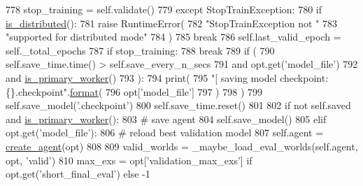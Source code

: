 \begin{DoxyCode}
778                         stop\_training = self.validate()
779                     \textcolor{keywordflow}{except} StopTrainException:
780                         \textcolor{keywordflow}{if} \hyperlink{namespaceparlai_1_1utils_1_1distributed_a023acb5e3b66e1f27e21247c35661279}{is\_distributed}():
781                             \textcolor{keywordflow}{raise} RuntimeError(
782                                 \textcolor{stringliteral}{"StopTrainException not "}
783                                 \textcolor{stringliteral}{"supported for distributed mode"}
784                             )
785                         \textcolor{keywordflow}{break}
786                     self.last\_valid\_epoch = self.\_total\_epochs
787                     \textcolor{keywordflow}{if} stop\_training:
788                         \textcolor{keywordflow}{break}
789                 \textcolor{keywordflow}{if} (
790                     self.save\_time.time() > self.save\_every\_n\_secs
791                     \textcolor{keywordflow}{and} opt.get(\textcolor{stringliteral}{'model\_file'})
792                     \textcolor{keywordflow}{and} \hyperlink{namespaceparlai_1_1utils_1_1distributed_a9bb1dac198180590ef8c6b6c6f9fc2c4}{is\_primary\_worker}()
793                 ):
794                     print(
795                         \textcolor{stringliteral}{"[ saving model checkpoint: \{\}.checkpoint"}.\hyperlink{namespaceparlai_1_1chat__service_1_1services_1_1messenger_1_1shared__utils_a32e2e2022b824fbaf80c747160b52a76}{format}(
796                             opt[\textcolor{stringliteral}{'model\_file'}]
797                         )
798                     )
799                     self.save\_model(\textcolor{stringliteral}{'.checkpoint'})
800                     self.save\_time.reset()
801 
802         \textcolor{keywordflow}{if} \textcolor{keywordflow}{not} self.saved \textcolor{keywordflow}{and} \hyperlink{namespaceparlai_1_1utils_1_1distributed_a9bb1dac198180590ef8c6b6c6f9fc2c4}{is\_primary\_worker}():
803             \textcolor{comment}{# save agent}
804             self.save\_model()
805         \textcolor{keywordflow}{elif} opt.get(\textcolor{stringliteral}{'model\_file'}):
806             \textcolor{comment}{# reload best validation model}
807             self.agent = \hyperlink{namespaceparlai_1_1core_1_1agents_a00d77a7e26fb89e8bd900f7b2a02982a}{create\_agent}(opt)
808 
809         valid\_worlds = \_maybe\_load\_eval\_worlds(self.agent, opt, \textcolor{stringliteral}{'valid'})
810         max\_exs = opt[\textcolor{stringliteral}{'validation\_max\_exs'}] \textcolor{keywordflow}{if} opt.get(\textcolor{stringliteral}{'short\_final\_eval'}) \textcolor{keywordflow}{else} -1

\end{DoxyCode}
